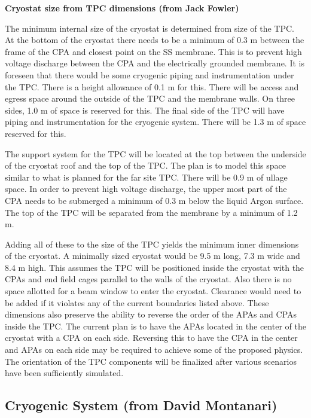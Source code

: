 \textbf{Cryostat size from TPC dimensions  (from Jack Fowler)}

The minimum internal size of the cryostat is determined from size of the TPC.  At the bottom of the 
cryostat there needs to be a minimum of 0.3 m between the frame of the CPA and closest point on the SS 
membrane.  This is to prevent high voltage discharge between the CPA and the electrically grounded 
membrane. It is foreseen that there would be some cryogenic piping and instrumentation under the TPC.  
There is a height allowance of 0.1 m for this.  There will be access and egress space around the outside 
of the TPC and the membrane walls.  On three sides, 1.0 m of space is reserved for this.  The final side of 
the TPC will have piping and instrumentation for the cryogenic system.  There will be 1.3 m of space 
reserved for this.  

The support system for the TPC will be located at the top between the underside of the cryostat roof and 
the top of the TPC.  The plan is to model this space similar to what is planned for the far site TPC.  There 
will be 0.9 m of ullage space.  In order to prevent high voltage discharge, the upper most part of the CPA 
needs to be submerged a minimum of 0.3 m below the liquid Argon surface.  The top of the TPC will be 
separated from the membrane by a minimum of 1.2 m.  

Adding all of these to the size of the TPC yields the minimum inner dimensions of the cryostat.  A 
minimally sized cryostat would be 9.5 m long, 7.3 m wide and 8.4 m high.  This assumes the TPC will be 
positioned inside the cryostat with the CPAs and end field cages parallel to the walls of the cryostat.  Also 
there is no space allotted for a beam window to enter the cryostat.  Clearance would need to be added if 
it violates any of the current boundaries listed above.  
These dimensions also preserve the ability to reverse the order of the APAs and CPAs inside the TPC.  The 
current plan is to have the APAs located in the center of the cryostat with a CPA on each side.  Reversing 
this to have the CPA in the center and APAs on each side may be required to achieve some of the 
proposed physics.  The orientation of the TPC components will be finalized after various scenarios have 
been sufficiently simulated.  

\subsection{Cryogenic System (from David Montanari)}

